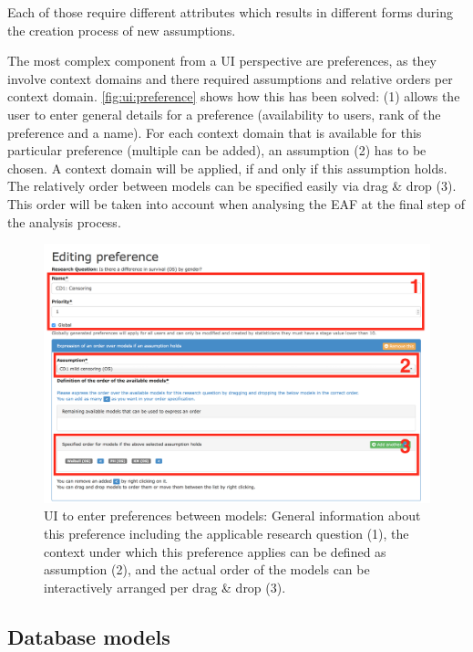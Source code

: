Each of those require different attributes which results in different forms during the creation process of new assumptions. 

The most complex component from a \gls{UI} perspective are preferences, as they involve context domains and there required assumptions and relative orders per context domain. \autoref{fig:ui:preference} shows how this has been solved: (1) allows the user to enter general details for a preference (availability to users, rank of the preference and a name). For each context domain that is available for this particular preference (multiple can be added), an assumption (2) has to be chosen. A context domain will be applied, if and only if this assumption holds. The relatively order between models can be specified easily via drag \& drop (3). This order will be taken into account when analysing the \gls{EAF} at the final step of the analysis process. 



\begin{figure}[h]
\centering
\includegraphics[width=\textwidth]{figures/ui_preference}
\caption{\gls{UI} to enter preferences between models: General information about this preference including the applicable research question (1), the context under which this preference applies can be defined as assumption (2), and the actual order of the models can be interactively arranged per drag \& drop (3).}
\label{fig:ui:preference}
\end{figure}


\subsection{Database models}
\label{sub:db}
